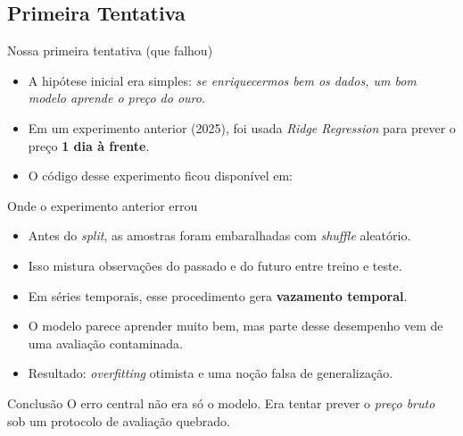 \documentclass{libs/ufc_format}
\begin{document}
\subsection{Primeira Tentativa}

\begin{frame}{Nossa primeira tentativa (que falhou)}
    \begin{itemize}
        \item A hipótese inicial era simples: \emph{se enriquecermos bem os dados, um bom modelo aprende o preço do ouro}.
        \item Em um experimento anterior (2025), foi usada \emph{Ridge Regression} para prever o preço \textbf{1 dia à frente}.
        \item O código desse experimento ficou disponível em:
    \end{itemize}

    \vspace{0.2cm}

    \vspace{0.3cm}
\end{frame}

\begin{frame}{Onde o experimento anterior errou}
    \begin{itemize}
        \item Antes do \emph{split}, as amostras foram embaralhadas com \emph{shuffle} aleatório.
        \item Isso mistura observações do passado e do futuro entre treino e teste.
        \item Em séries temporais, esse procedimento gera \textbf{vazamento temporal}.
        \item O modelo parece aprender muito bem, mas parte desse desempenho vem de uma avaliação contaminada.
        \item Resultado: \emph{overfitting} otimista e uma noção falsa de generalização.
    \end{itemize}

    \vspace{0.3cm}
    \begin{block}{Conclusão}
        O erro central não era só o modelo. Era tentar prever o \emph{preço bruto} sob um protocolo de avaliação quebrado.
    \end{block}
\end{frame}
\end{document}
